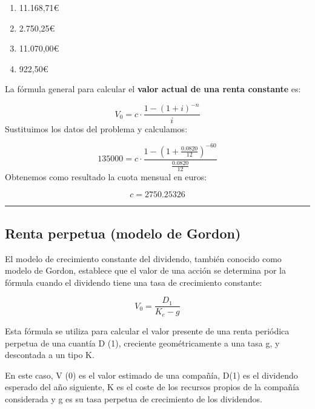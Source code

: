\documentclass[
  letterpaper,
  DIV=11,
  numbers=noendperiod]{scrreprt}
\begin{document}
\begin{tcolorbox}
\begin{enumerate}
\def\labelenumi{\alph{enumi}.}
\item
  11.168,71€
\item
  2.750,25€
\item
  11.070,00€
\item
  922,50€
\end{enumerate}

\begin{tcolorbox}[enhanced jigsaw, toprule=.15mm, left=2mm, breakable, opacitybacktitle=0.6, toptitle=1mm, coltitle=black, arc=.35mm, leftrule=.75mm, bottomtitle=1mm, titlerule=0mm, title=\textcolor{quarto-callout-tip-color}{\faLightbulb}\hspace{0.5em}{Solución}, rightrule=.15mm, opacityback=0, bottomrule=.15mm, colback=white, colframe=quarto-callout-tip-color-frame, colbacktitle=quarto-callout-tip-color!10!white]

La fórmula general para calcular el \textbf{valor actual de una renta
constante} es:

\[V_0=c\cdot\frac{1-\left(1+i\right)^{-n}}{i}\] Sustituimos los datos
del problema y calculamos:

\[135000=c\cdot \frac{1-\left(1+\frac{0.0820}{12}\right)^{-60}}{\frac{0.0820}{12}}\]
Obtenemos como resultado la cuota mensual en euros:

\[c=2750.25326\]

\end{tcolorbox}

\begin{center}\rule{0.5\linewidth}{0.5pt}\end{center}

\subsection{Renta perpetua (modelo de
Gordon)}\label{renta-perpetua-modelo-de-gordon}

El modelo de crecimiento constante del dividendo, también conocido como
modelo de Gordon, establece que el valor de una acción se determina por
la fórmula cuando el dividendo tiene una tasa de crecimiento constante:

\[V_0 = \frac{D_1}{K_e- g}\]

Esta fórmula se utiliza para calcular el valor presente de una renta
periódica perpetua de una cuantía D (1), creciente geométricamente a una
tasa g, y descontada a un tipo K.

En este caso, V (0) es el valor estimado de una compañía, D(1) es el
dividendo esperado del año siguiente, K es el coste de los recursos
propios de la compañía considerada y g es su tasa perpetua de
crecimiento de los dividendos.


\end{tcolorbox}
\end{document}
